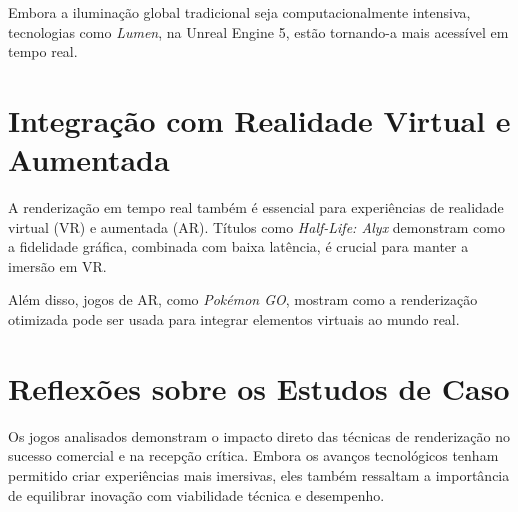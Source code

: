 Embora a iluminação global tradicional seja computacionalmente intensiva, tecnologias como \textit{Lumen}, na Unreal Engine 5, estão tornando-a mais acessível em tempo real.

\section{Integração com Realidade Virtual e Aumentada}
A renderização em tempo real também é essencial para experiências de realidade virtual (VR) e aumentada (AR). Títulos como \textit{Half-Life: Alyx} demonstram como a fidelidade gráfica, combinada com baixa latência, é crucial para manter a imersão em VR.

Além disso, jogos de AR, como \textit{Pokémon GO}, mostram como a renderização otimizada pode ser usada para integrar elementos virtuais ao mundo real.

\section{Reflexões sobre os Estudos de Caso}
Os jogos analisados demonstram o impacto direto das técnicas de renderização no sucesso comercial e na recepção crítica. Embora os avanços tecnológicos tenham permitido criar experiências mais imersivas, eles também ressaltam a importância de equilibrar inovação com viabilidade técnica e desempenho.


